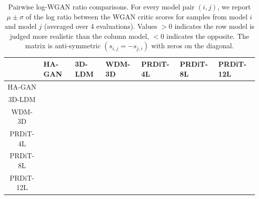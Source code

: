 \begin{table}[!htbp]
\centering

\setlength{\tabcolsep}{2pt}        %
\renewcommand{\arraystretch}{1.35} %
\setlength{\extrarowheight}{1.5pt} %

\begin{tabular}{c|*{6}{M{1.25cm}}} %
\toprule
& HA-GAN & 3D-LDM & WDM-3D & PRDiT-4L & PRDiT-8L & PRDiT-12L \\
\midrule
HA-GAN
  &           &  &  &  &  &  \\ \addlinespace[4pt]
3D-LDM
  &   &         &  &  &  &  \\ \addlinespace[4pt]
WDM-3D
  &     &   &         &  &  &  \\ \addlinespace[4pt]
PRDiT-4L
  &     &   & &         & & \\ \addlinespace[4pt]
PRDiT-8L
  &     &   & & &          & \\ \addlinespace[4pt]
PRDiT-12L
  &     &   &   &  &   &  \\
\bottomrule
\end{tabular}
\caption{Pairwise log-WGAN ratio comparisons. For every model pair $(i,j)$, we report $\mu \pm \sigma$ of the log ratio between the WGAN critic scores for samples from model $i$ and model $j$ (averaged over 4 evaluations). Values $>0$ indicates the row model is judged more realistic than the column model, $<0$ indicates the opposite. The matrix is anti-symmetric $(s_{i,j}=-s_{j,i})$ with zeros on the diagonal.}
\label{tab:logwgan}
\end{table}


